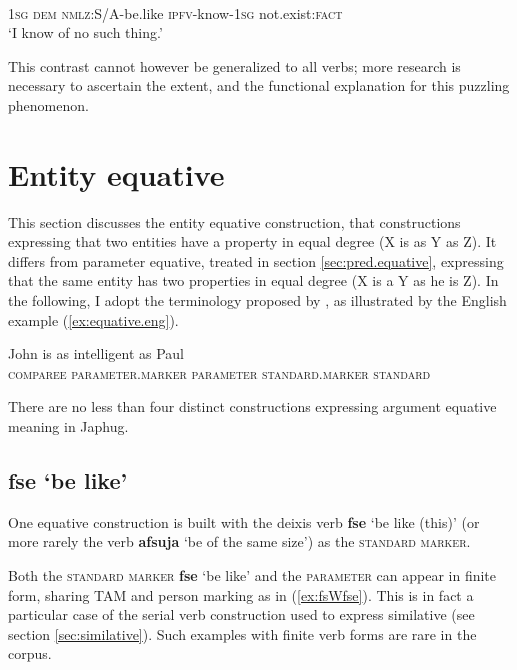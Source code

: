 \documentclass[oneside,a4paper,11pt]{article}
\newcommand{\ipa}[1]{{\phon\textbf{#1}}} %
\newcommand{\forme}[2]{\ipa{#1} `#2'}
\begin{document}
\begin{exe}
\ex \label{ex:pjWsWza}
\gll [\ipa{aʑo} 	\ipa{nɯ} 	\ipa{kɯ-fse} 	\ipa{pjɯ-sɯz-a}]	\ipa{me} \\
\textsc{1sg} \textsc{dem} \textsc{nmlz}:S/A-be.like \textsc{ipfv}-know-\textsc{1sg} not.exist:\textsc{fact} \\
\glt `I know of no such thing.'
\end{exe}

This contrast cannot however be generalized to all verbs; more research is necessary to ascertain the extent, and the functional explanation for this puzzling phenomenon.

\section{Entity equative} \label{sec:arg.equative}
This section discusses the entity equative construction, that constructions expressing that two entities have a property in equal degree (X is as Y as Z). It differs from parameter equative, treated in section \ref{sec:pred.equative}, expressing that the same entity has two properties in equal degree (X is a Y as he is Z). In the following, I adopt the terminology proposed by \citet{haspelmath08equative}, as illustrated by the English example (\ref{ex:equative.eng}). 

\begin{exe}
\ex \label{ex:equative.eng}
\gll  John is as intelligent as Paul \\
\textsc{comparee} { } \textsc{parameter.marker} \textsc{parameter} \textsc{standard.marker} \textsc{standard}  \\
\end{exe}

There are no less than four distinct constructions expressing argument equative meaning in Japhug. 

\subsection{\forme{fse}{be like}} \label{sec:fse}
One equative construction is built with the deixis verb \forme{fse}{be like (this)} (or more rarely the verb \forme{afsuja}{be of the same size}) as the \textsc{standard marker}.

Both  the \textsc{standard marker} \forme{fse}{be like} and the \textsc{parameter} can appear in finite form, sharing TAM and person marking as in (\ref{ex:fsWfse}). This is in fact a particular case of the serial verb construction used to express similative (see section \ref{sec:similative}). Such examples with finite verb forms are rare in the corpus.
\end{document}
